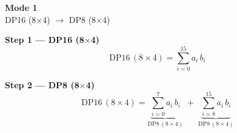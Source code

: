 \documentclass[fleqn]{article}
\newcommand{\DPop}[3]{\mathrm{DP#1}\,(#2\!\times\!#3)}
\begin{document}
\begin{center}
{\LARGE \textbf{Mode 1}}\\[4pt]
{\large DP16 (8$\times$4) $\rightarrow$ DP8 (8$\times$4)}
\end{center}

\vspace{4em}

\noindent\textbf{Step 1 --- DP16 (8$\times$4)}
\[
\DPop{16}{8}{4} = \sum_{i=0}^{15} a_i \, b_i
\]

\vspace{0.5em}

\noindent\textbf{Step 2 --- DP8 (8$\times$4)}
\[
\DPop{16}{8}{4}
  = \underbrace{\sum_{i=0}^{7} a_i \, b_i}_{\DPop{8}{8}{4}}
  \; + \; \underbrace{\sum_{i=8}^{15} a_i \, b_i}_{\DPop{8}{8}{4}}
\]
\end{document}
